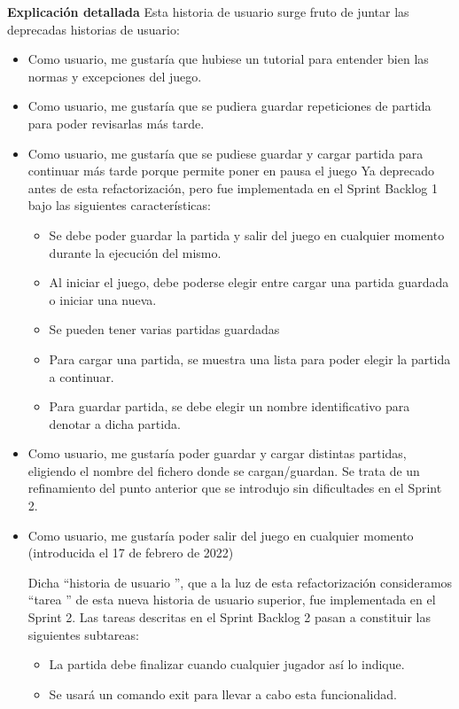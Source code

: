 \documentclass[../../FINAL/Scrum/SCRUM.tex]{subfiles}
\begin{document}
\textbf{Explicación detallada}
Esta historia de usuario surge fruto de juntar las deprecadas historias de usuario:
\begin{itemize}
\item  Como usuario, me gustaría que hubiese un tutorial para entender bien las normas y excepciones del juego. 

\item  Como usuario, me gustaría que se pudiera guardar repeticiones de partida para poder revisarlas más tarde. 

\item  Como usuario, me gustaría que se pudiese guardar y cargar partida para continuar más tarde porque permite poner en pausa el juego 
    Ya deprecado antes de esta refactorización, pero fue implementada en el Sprint Backlog 1 bajo las siguientes características:
    \begin{itemize}
    \item Se debe poder guardar la partida y salir del juego en cualquier momento durante la ejecución del mismo.
     \item Al iniciar el juego, debe poderse elegir entre cargar una partida guardada o iniciar una nueva.
     \item Se pueden tener varias partidas guardadas
     \item Para cargar una partida, se muestra una lista para poder elegir la partida a continuar.
     \item Para guardar partida, se debe elegir un nombre identificativo para denotar a dicha partida.
    \end{itemize}
\item  Como usuario, me gustaría poder guardar y cargar distintas partidas, eligiendo el nombre del fichero donde se cargan/guardan. 
    Se trata de un refinamiento del punto anterior que se introdujo sin dificultades en el Sprint 2.
    
\item  Como usuario, me gustaría poder salir del juego en cualquier momento (introducida el 17 de febrero de 2022) 

    Dicha  ``historia de usuario '', que a la luz de esta refactorización consideramos  ``tarea '' de esta nueva historia de usuario superior, fue implementada en el Sprint 2. Las tareas descritas en el Sprint Backlog 2 pasan a constituir las siguientes subtareas:
    \begin{itemize}
    \item La partida debe finalizar cuando cualquier jugador así lo indique.
    \item Se usará un comando  exit  para llevar a cabo esta funcionalidad.
    \end{itemize}
\end{itemize}

\end{document}
